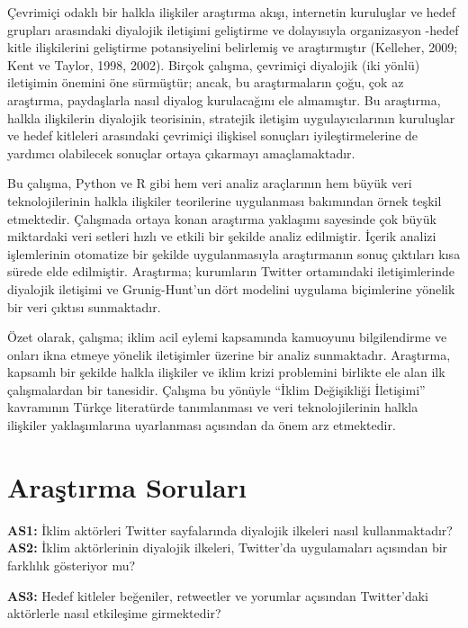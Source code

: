 \documentclass[
]{book}
\begin{document}
Çevrimiçi odaklı bir halkla ilişkiler araştırma akışı, internetin kuruluşlar ve hedef grupları arasındaki diyalojik iletişimi geliştirme ve dolayısıyla organizasyon -hedef kitle ilişkilerini geliştirme potansiyelini belirlemiş ve araştırmıştır (Kelleher, 2009; Kent ve Taylor, 1998, 2002). Birçok çalışma, çevrimiçi diyalojik (iki yönlü) iletişimin önemini öne sürmüştür; ancak, bu araştırmaların çoğu, çok az araştırma, paydaşlarla nasıl diyalog kurulacağını ele almamıştır. Bu araştırma, halkla ilişkilerin diyalojik teorisinin, stratejik iletişim uygulayıcılarının kuruluşlar ve hedef kitleleri arasındaki çevrimiçi ilişkisel sonuçları iyileştirmelerine de yardımcı olabilecek sonuçlar ortaya çıkarmayı amaçlamaktadır.

Bu çalışma, Python ve R gibi hem veri analiz araçlarının hem büyük veri teknolojilerinin halkla ilişkiler teorilerine uygulanması bakımından örnek teşkil etmektedir. Çalışmada ortaya konan araştırma yaklaşımı sayesinde çok büyük miktardaki veri setleri hızlı ve etkili bir şekilde analiz edilmiştir. İçerik analizi işlemlerinin otomatize bir şekilde uygulanmasıyla araştırmanın sonuç çıktıları kısa sürede elde edilmiştir. Araştırma; kurumların Twitter ortamındaki iletişimlerinde diyalojik iletişimi ve Grunig-Hunt'un dört modelini uygulama biçimlerine yönelik bir veri çıktısı sunmaktadır.

Özet olarak, çalışma; iklim acil eylemi kapsamında kamuoyunu bilgilendirme ve onları ikna etmeye yönelik iletişimler üzerine bir analiz sunmaktadır. Araştırma, kapsamlı bir şekilde halkla ilişkiler ve iklim krizi problemini birlikte ele alan ilk çalışmalardan bir tanesidir. Çalışma bu yönüyle ``İklim Değişikliği İletişimi'' kavramının Türkçe literatürde tanımlanması ve veri teknolojilerinin halkla ilişkiler yaklaşımlarına uyarlanması açısından da önem arz etmektedir.

\hypertarget{araux15ftux131rma-sorularux131}{%
\section{Araştırma Soruları}\label{araux15ftux131rma-sorularux131}}

\textbf{AS1:} İklim aktörleri Twitter sayfalarında diyalojik ilkeleri nasıl kullanmaktadır?
\textbf{AS2:} İklim aktörlerinin diyalojik ilkeleri, Twitter'da uygulamaları açısından bir
farklılık gösteriyor mu?

\textbf{AS3:} Hedef kitleler beğeniler, retweetler ve yorumlar açısından Twitter'daki aktörlerle nasıl etkileşime girmektedir?
\end{document}

